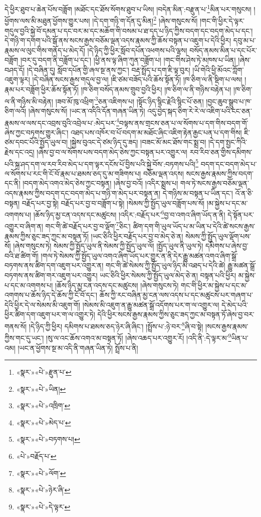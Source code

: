 དེ་ཕྱིར་ཐུབ་པ་ཆེན་པོས་བཟློག །མཐོང་དང་ཐོས་སོགས་ཐུབ་པ་ཡིས། །བདེན་མིན་:བརྫུན་པ་\footnote{«སྣར་»«པེ་»རྫུན་པ་}མིན་པར་གསུངས། །ཕྱོགས་ལས་མི་མཐུན་ཕྱོགས་གྱུར་པས། །དེ་དག་གཉི་ག་དོན་དུ་མིན།\footnote{«སྣར་»«པེ་»ཡིན།} །ཞེས་གསུངས་སོ། །གང་གི་ཕྱིར་དེ་ལྟར་གདུལ་བྱའི་སྐྱེ་བོ་དམན་པ་དང་བར་མ་དང་མཆོག་གི་བསམ་པ་ཐ་དད་པ་ཉིད་ཀྱིས་བདག་དང་བདག་མེད་པ་དང་། དེ་གཉི་ག་དགག་པའི་སྒོ་ནས་སངས་རྒྱས་བཅོམ་ལྡན་འདས་རྣམས་ཀྱི་ཆོས་བསྟན་པ་འཇུག་པ་དེའི་ཕྱིར། དབུ་མ་པ་རྣམས་ལ་ལུང་གིས་གནོད་པ་མེད་དོ། །དེ་ཉིད་ཀྱི་ཕྱིར་སློབ་དཔོན་འཕགས་པའི་ལྷས། བསོད་ནམས་མིན་པ་དང་པོར་བཟློག །བར་དུ་བདག་ནི་བཟློག་པ་དང་། །ཕྱི་ནས་ལྟ་ཞིག་ཀུན་བཟློག་པ། །གང་གིས་ཤེས་ཏེ་མཁས་པ་ཡིན། །ཞེས་བཤད་དོ། །དེ་བཞིན་དུ། སློབ་དཔོན་གྱི་ཞལ་སྔ་ནས་ཀྱང་། བརྡ་སྤྲོད་པ་དག་ཇི་ལྟ་བུར། །ཡི་གེའི་ཕྱི་མོའང་ཀློག་འཇུག་ལྟར། །དེ་བཞིན་སངས་རྒྱས་གདུལ་བྱ་ལ། །ཇི་ཙམ་བཟོད་པའི་ཆོས་སྟོན་ཏོ། །ཁ་ཅིག་ལ་ནི་སྡིག་པ་ལས། །རྣམ་པར་བཟློག་ཕྱིར་ཆོས་སྟོན་ཏོ། །ཁ་ཅིག་བསོད་ནམས་གྲུབ་བྱའི་ཕྱིར། །ཁ་ཅིག་ལ་ནི་གཉིས་བརྟེན་པ། །ཁ་ཅིག་ལ་ནི་གཉིས་མི་བརྟེན། །ཟབ་མོ་ཁུ་འཕྲིག་\footnote{«སྣར་»«པེ་»འཁྲིག་}ཅན་འཇིགས་པ། །སྟོང་ཉིད་སྙིང་རྗེའི་སྙིང་པོ་ཅན། །བྱང་ཆུབ་སྒྲུབ་པ་ཁ་ཅིག་ལའོ། །ཞེས་གསུངས་སོ། །ཡང་ན་འདིའི་དོན་གཞན་ཡིན་ཏེ། འདུ་བྱེད་སྐད་ཅིག་རེ་རེ་ལ་འཇིག་པའི་ངང་ཅན་རྣམས་ལ་ལས་དང་འབྲས་བུའི་འབྲེལ་པ་:མེད་པར་\footnote{«སྣར་»«པེ་»མེད་པ་}བལྟས་ནས་གྲངས་ཅན་པ་ལ་སོགས་པ་དག་གིས་བདག་གོ་ཞེས་ཀྱང་བཏགས་གྱུར་ཞིང་། འཐད་པས་འཁོར་བ་པོ་བདག་མ་མཐོང་ཞིང་འཇིག་རྟེན་རྒྱང་པན་པ་དག་གིས། ཇི་ཙམ་དབང་པོའི་སྤྱོད་ཡུལ་བ། །སྐྱེས་བུའང་དེ་ཙམ་ཉིད་དུ་ཟད། །བཟང་མོ་མང་ཐོས་གང་སྨྲ་བ། །དེ་དག་སྤྱང་ཀིའི་རྗེས་དང་འདྲ། །ཞེས་བྱ་བ་ལ་སོགས་པས་བདག་མེད་ཅེས་ཀྱང་བསྟན་པར་འགྱུར་ལ། རབ་རིབ་ཅན་གྱིས་དམིགས་པའི་སྐྲ་ཤད་དག་ལ་རབ་རིབ་མེད་པ་དག་ལྟར་དངོས་པོ་བྱིས་པའི་སྐྱེ་བོས་:བཏགས་པའི།\footnote{«སྣར་»«པེ་»བཏགས་པ།} བདག་དང་བདག་མེད་པ་ལ་སོགས་པ་རང་གི་ངོ་བོ་རྣམ་པ་ཐམས་ཅད་དུ་མ་གཟིགས་པ། བཅོམ་ལྡན་འདས། སངས་རྒྱས་རྣམས་ཀྱིས་བདག་དང་ནི། །བདག་མེད་འགའ་མེད་ཅེས་ཀྱང་བསྟན། །ཞེས་བྱ་བའོ། །འདིར་སྨྲས་པ། གལ་ཏེ་སངས་རྒྱས་བཅོམ་ལྡན་འདས་རྣམས་ཀྱིས་བདག་དང་བདག་མེད་པ་གཉི་ག་མེད་པར་བསྟན་ན། དེ་གཉིས་མ་བསྟན་པ་ཡིན་དང་། འོ་ན་ཅི་བསྟན། བརྗོད་པར་བྱ་སྟེ། བརྗོད་པར་བྱ་བ་བཟློག་པ་སྟེ། །སེམས་ཀྱི་སྤྱོད་ཡུལ་བཟློག་པས་སོ། །མ་སྐྱེས་པ་དང་མ་འགགས་པ། །ཆོས་ཉིད་མྱ་ངན་འདས་དང་མཚུངས། །འདིར་:བརྗོད་པར་\footnote{«པེ་»བརྗོད་པ་}བྱ་བ་འགའ་ཞིག་ཡོད་ན་ནི། དེ་སྟོན་པར་འགྱུར་བ་ཞིག་ན། གང་གི་ཚེ་བརྗོད་པར་བྱ་བ་ལྡོག་\footnote{«སྣར་»«པེ་»ལོག་}ཅིང་། ཚིག་དག་གི་ཡུལ་ཡོད་པ་མ་ཡིན་པ་དེའི་ཚེ་སངས་རྒྱས་རྣམས་ཀྱིས་ཅུང་ཟད་ཀྱང་མ་བསྟན་ཏོ། །ཡང་ཅིའི་ཕྱིར་བརྗོད་པར་བྱ་བ་མེད་ཅེ་ན། སེམས་ཀྱི་སྤྱོད་ཡུལ་ལྡོག་པས་སོ། །ཞེས་གསུངས་ཏེ། སེམས་ཀྱི་སྤྱོད་ཡུལ་ནི་སེམས་ཀྱི་སྤྱོད་ཡུལ་ལོ། །སྤྱོད་ཡུལ་ནི་ཡུལ་ཏེ། དམིགས་པ་ཞེས་བྱ་བའི་ཐ་ཚིག་གོ། །གལ་ཏེ་སེམས་ཀྱི་སྤྱོད་ཡུལ་འགའ་ཞིག་ཡོད་པར་གྱུར་ན་ནི་དེར་རྒྱུ་མཚན་འགའ་ཞིག་སྒྲོ་བཏགས་ནས་ཚིག་དག་འཇུག་པར་འགྱུར་ན། གང་གི་ཚེ་སེམས་ཀྱི་སྤྱོད་ཡུལ་ཉིད་མི་འཐད་པ་དེའི་ཚེ། རྒྱུ་མཚན་སྒྲོ་བཏགས་ནས་ཚིག་གར་འཇུག་པར་འགྱུར། ཡང་ཅིའི་ཕྱིར་སེམས་ཀྱི་སྤྱོད་ཡུལ་མེད་ཅེ་ན། བསྟན་པའི་ཕྱིར། མ་སྐྱེས་པ་དང་མ་འགགས་པ། །ཆོས་ཉིད་མྱ་ངན་འདས་དང་མཚུངས། །ཞེས་གསུངས་ཏེ། གང་གི་ཕྱིར་མ་སྐྱེས་པ་དང་མ་འགགས་པ་ཆོས་ཉིད་དེ་ཆོས་ཀྱི་ངོ་བོ་དང་། ཆོས་ཀྱི་རང་བཞིན་མྱ་ངན་ལས་འདས་པ་དང་མཚུངས་པར་གཞག་པ་དེའི་ཕྱིར་དེ་ལ་སེམས་མི་འཇུག་གོ། །སེམས་མི་འཇུག་ན་རྒྱུ་མཚན་སྒྲོ་འདོགས་པར་ག་ལ་འགྱུར་ལ། དེ་མེད་པའི་ཕྱིར་ཚིག་དག་འཇུག་པར་ག་ལ་འགྱུར་ཏེ། དེའི་ཕྱིར་སངས་རྒྱས་རྣམས་ཀྱིས་ཅུང་ཟད་ཀྱང་མ་བསྟན་ཏོ་ཞེས་བྱ་བར་གནས་སོ། །དེ་ཉིད་ཀྱི་ཕྱིར། དམིགས་པ་ཐམས་ཅད་ཉེར་ཞི་ཞིང་། །སྤྲོས་པ་:ཉེ་བར་\footnote{«སྣར་»«པེ་»ཉེར་ཞི་}ཞི་བ་སྟེ། །སངས་རྒྱས་རྣམས་ཀྱིས་གང་དུ་ཡང་། །སུ་ལ་འང་ཆོས་འགའ་མ་བསྟན་ཏོ། །ཞེས་འཆད་པར་འགྱུར་རོ། །འདི་ནི་:དེ་ལྟར་མ་\footnote{«སྣར་»«པེ་»དེ་ལྟར་}ཡིན་པ་འམ། །ཡང་ན་ཕྱོགས་སྔ་མ་འདི་ནི་གཞན་ཡིན་ཏེ། སྤྲོས་པ་ནི། 
